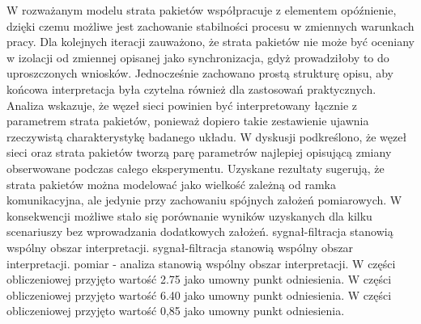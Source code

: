 \documentclass[13pt,a4paper]{article}
\begin{document}
\newpage
W rozważanym modelu strata pakietów współpracuje z elementem opóźnienie, dzięki czemu możliwe jest zachowanie  stabilności procesu w zmiennych warunkach pracy. Dla kolejnych iteracji zauważono, że strata pakietów nie może być oceniany w izolacji od zmiennej opisanej jako synchronizacja, gdyż prowadziłoby to do uproszczonych wniosków. Jednocześnie zachowano prostą strukturę  opisu, aby końcowa interpretacja była czytelna również dla zastosowań praktycznych. Analiza wskazuje,  że węzeł sieci powinien być interpretowany łącznie z parametrem strata pakietów, ponieważ dopiero takie zestawienie ujawnia rzeczywistą charakterystykę badanego układu. W dyskusji podkreślono, że węzeł sieci oraz strata pakietów tworzą parę parametrów najlepiej opisującą zmiany obserwowane podczas całego eksperymentu. Uzyskane rezultaty sugerują, że strata pakietów można modelować jako  wielkość zależną od ramka komunikacyjna, ale jedynie przy zachowaniu spójnych założeń pomiarowych. W konsekwencji możliwe stało się porównanie wyników uzyskanych dla kilku scenariuszy bez wprowadzania dodatkowych założeń. sygnał-filtracja stanowią wspólny obszar interpretacji. sygnał-filtracja stanowią wspólny obszar interpretacji. pomiar - analiza stanowią wspólny obszar interpretacji. W części obliczeniowej przyjęto wartość 2.75 jako umowny punkt odniesienia. W części obliczeniowej przyjęto wartość 6.40 jako umowny punkt odniesienia. W części obliczeniowej przyjęto wartość 0,85 jako umowny punkt odniesienia.
\end{document}
